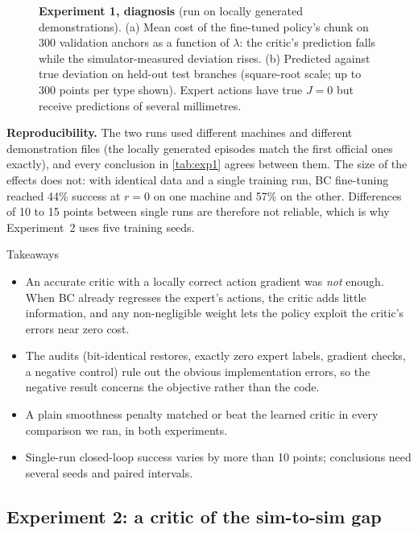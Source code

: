 \begin{figure}[t]
  \centering
  \caption{\textbf{Experiment 1, diagnosis} (run on locally generated demonstrations). (a) Mean cost of the fine-tuned policy's chunk on 300 validation anchors as a function of $\lambda$: the critic's prediction falls while the simulator-measured deviation rises. (b) Predicted against true deviation on held-out test branches (square-root scale; up to 300 points per type shown). Expert actions have true $J=0$ but receive predictions of several millimetres.}
  \label{fig:exp1-surrogate}
\end{figure}

\textbf{Reproducibility.} The two runs used different machines and different demonstration files (the locally generated episodes match the first official ones exactly), and every conclusion in \cref{tab:exp1} agrees between them. The size of the effects does not: with identical data and a single training run, BC fine-tuning reached 44\% success at $r=0$ on one machine and 57\% on the other. Differences of 10 to 15 points between single runs are therefore not reliable, which is why Experiment~2 uses five training seeds.

\begin{AIbox}{Takeaways}
\begin{itemize}[leftmargin=*, itemsep=2pt, topsep=2pt]
  \item An accurate critic with a locally correct action gradient was \emph{not} enough. When BC already regresses the expert's actions, the critic adds little information, and any non-negligible weight lets the policy exploit the critic's errors near zero cost.
  \item The audits (bit-identical restores, exactly zero expert labels, gradient checks, a negative control) rule out the obvious implementation errors, so the negative result concerns the objective rather than the code.
  \item A plain smoothness penalty matched or beat the learned critic in every comparison we ran, in both experiments.
  \item Single-run closed-loop success varies by more than 10 points; conclusions need several seeds and paired intervals.
\end{itemize}
\end{AIbox}

\subsection{Experiment 2: a critic of the sim-to-sim gap}

